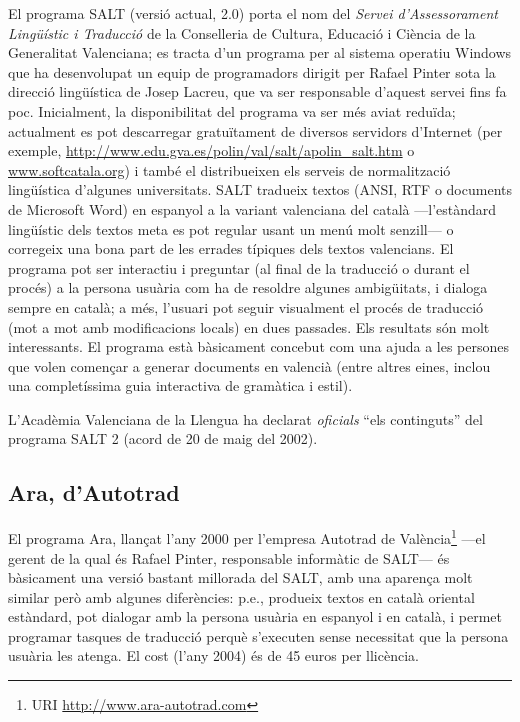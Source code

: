 El programa SALT (versió actual, 2.0) porta el nom del \emph{Servei d'Assessorament
  Lingüístic i Traducció} de la Conselleria de Cultura, Educació i
Ciència de la Generalitat Valenciana; es tracta d'un programa per al
sistema operatiu Windows que ha desenvolupat un equip de programadors
dirigit per Rafael Pinter sota la direcció lingüística de Josep
Lacreu, que va ser responsable d'aquest servei fins fa poc.
Inicialment, la disponibilitat del programa va ser més aviat reduïda;
actualment es pot descarregar gratuïtament de diversos servidors
d'Internet (per exemple,
\url{http://www.edu.gva.es/polin/val/salt/apolin_salt.htm}
o \url{www.softcatala.org}) i també el distribueixen els serveis
de normalització lingüística d'algunes universitats.  SALT tradueix
textos (ANSI, RTF o documents de Microsoft Word) en espanyol a la
variant valenciana del català ---l'estàndard lingüístic dels textos
meta es pot regular usant un menú molt senzill--- o corregeix una bona
part de les errades típiques dels textos valencians. El programa pot
ser interactiu i preguntar (al final de la traducció o durant el
procés) a la persona usuària com ha de resoldre algunes ambigüitats, i
dialoga sempre en català; a més, l'usuari pot seguir visualment el
procés de traducció (mot a mot amb modificacions locals) en dues
passades. Els resultats són molt interessants. El programa està
bàsicament concebut com una ajuda a les persones que volen
començar a generar documents en valencià (entre altres eines,
inclou una completíssima guia interactiva de gramàtica i estil).

L'Acadèmia Valenciana de la Llengua ha declarat \emph{oficials} ``els
continguts'' del programa SALT 2 (acord de 20 de maig del 2002).

\subsection{Ara, d'Autotrad}

El programa Ara, llançat l'any 2000 per l'empresa Autotrad de
València\footnote{URI \url{http://www.ara-autotrad.com}} ---el
gerent de la qual és Rafael Pinter, responsable informàtic de SALT---
és bàsicament una versió bastant millorada del SALT, amb una aparença
molt similar però amb algunes diferències: p.e., produeix textos en
català oriental estàndard, pot dialogar amb la persona usuària en
espanyol i en català, i permet programar tasques de traducció perquè
s'executen sense necessitat que la persona usuària les atenga. El cost
(l'any 2004) és de 45 euros per llicència.

